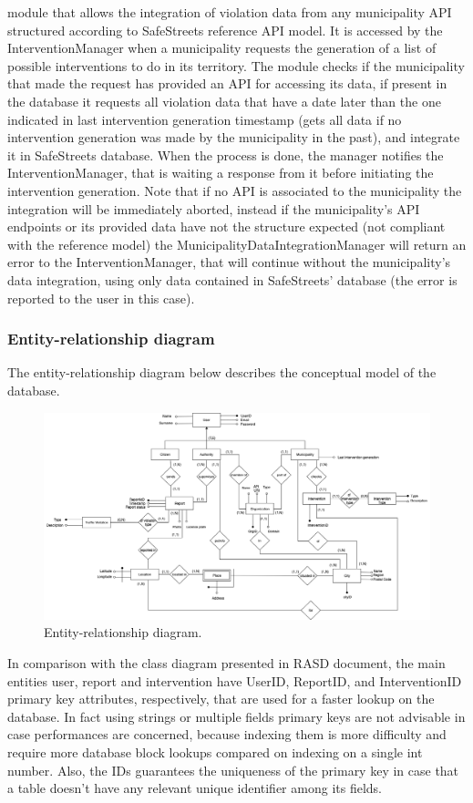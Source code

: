 \begin{itemize}
	module that allows the integration of violation data from any municipality API structured according to SafeStreets reference API model. It is accessed by the InterventionManager when a municipality requests the generation of a list of possible interventions to do in its territory. The module checks if the municipality that made the request has provided an API for accessing its data, if present in the database it requests all violation data that have a date later than the one indicated in last intervention generation timestamp (gets all data if no intervention generation was made by the municipality in the past), and integrate it in SafeStreets database. When the process is done, the manager notifies the InterventionManager, that is waiting a response from it before initiating the intervention generation. Note that if no API is associated to the municipality the integration will be immediately aborted, instead if the municipality's API endpoints or its provided data have not the structure expected (not compliant with the reference model) the MunicipalityDataIntegrationManager will return an error to the InterventionManager, that will continue without the municipality's data integration, using only data contained in SafeStreets' database (the error is reported to the user in this case).
\end{itemize}


\subsubsection{Entity-relationship diagram}
The entity-relationship diagram below describes the conceptual model of the database.

\begin{figure}[H]
	\centering
	\includegraphics[width=\linewidth]{Images/ER_diagram.png}
	\caption{Entity-relationship diagram.}
\end{figure}

In comparison with the class diagram presented in RASD document, the main entities user, report and intervention have UserID, ReportID, and InterventionID primary key attributes, respectively, that are used for a faster lookup on the database. In fact using strings or multiple fields primary keys are not advisable in case performances are concerned, because indexing them is more difficulty and require more database block lookups compared on indexing on a single int number. Also, the IDs guarantees the uniqueness of the primary key in case that a table doesn't have any relevant unique identifier among its fields.

